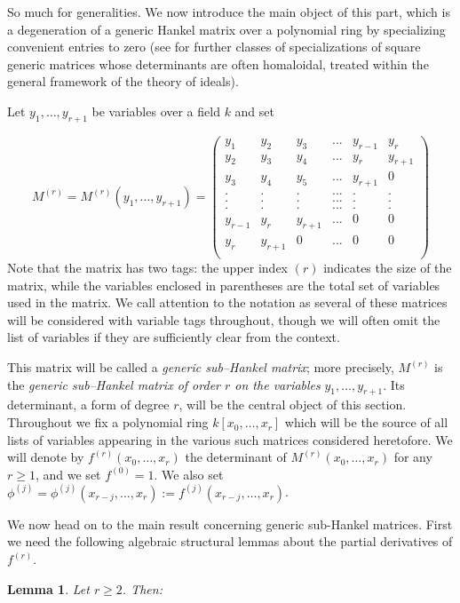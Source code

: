 \documentclass[11pt]{article}   %
\newtheorem{Lemma}[Theorem]{Lemma}
\theoremstyle{definition}
\numberwithin{Theorem}{section} \numberwithin{equation}{section}
\begin{document}
{So much for generalities. We now introduce the main object of this
part, which is a degeneration of a generic Hankel matrix over a
polynomial ring by specializing convenient entries to zero (see
\cite{cremona2} for further classes of specializations of square
generic matrices whose determinants are often homaloidal, treated
within the general framework of the theory of ideals).

Let $y_1,\ldots,y_{r+1}$ be variables over a field $k$ and
set

$$
M^{(r)}=M^{(r)}(y_1,\ldots,y_{r+1})= \left(
\begin{matrix}
y_1&y_2&y_3&...&y_{r-1}&y_{r}\\
y_2&y_3&y_4&...&y_{r}&y_{r+1}\\
y_3&y_4&y_5&...&y_{r+1}&0\\
.&.&.&...&.&.\\
.&.&.&...&.&.\\
.&.&.&...&.&.\\
y_{r-1}&y_{r}&y_{r+1}&...&0&0\\
y_{r}&y_{r+1}&0&...&0&0\\
\end{matrix}
\right )
$$
Note that the matrix has two tags: the upper index $(r)$ indicates
the size of the matrix, while the variables enclosed in parentheses
are the total set of variables used in the matrix. We call attention
to the notation as several of these matrices will be considered with
variable tags throughout, though we will often omit the list of
variables if they are sufficiently clear from the context.

This matrix will be called a {\it generic sub--Hankel matrix\/};
more precisely, $M^{(r)}$ is the {\em generic sub--Hankel matrix of
order $r$ on the variables} $y_1,\ldots,y_{r+1}$. Its determinant, a
form of degree $r$, will be the central object of this section.
Throughout we fix a polynomial ring $k[x_0,\ldots,x_r]$ which will
be the source of all lists of variables appearing in the various
such matrices considered heretofore. We will denote by
$f^{(r)}(x_0,\ldots,x_r)$ the determinant of
$M^{(r)}(x_0,\ldots,x_r)$ for any $r\geq 1$, and we set $f^{(0)}=1$.
We also set
$\phi^{(j)}=\phi^{(j)}(x_{r-j},\ldots,x_r):=f^{(j)}(x_{r-j},\ldots,x_r)$.

We now head on to the main result concerning generic sub-Hankel
matrices. First we need the following algebraic structural lemmas
about the partial derivatives of $f^{(r)}$.

\begin{Lemma}\label{basic_lemma} Let $r\geq 2$. Then:


\end{Lemma}}
\end{document}
